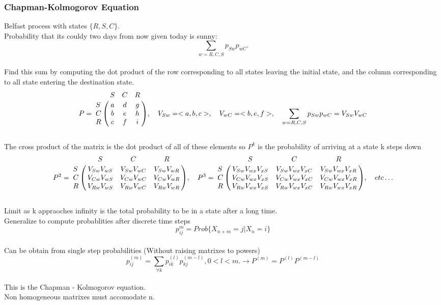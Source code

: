 \documentclass{article}
\begin{document}
	\subsubsection {Chapman-Kolmogorov Equation}
	Belfast process with states $\{R,S,C\}$. 
	\\Probability that its couldy two days from now given today is sunny: 
	\[ \sum\limits_{w=R,C,S}{p_{Sw}p_{wC}}. \]
	\\Find this sum by computing the dot product of the row corresponding to all states leaving the initial state, and the column corresponding to all state
	entering the destination state. 
	\[P = \bordermatrix{   
              & S    & C    & R    \cr
            S & a & d & g \cr
			C & b & e & h \cr
			R & c & f & i } 
			, \quad V_{Sw} = <a,b,c>
			, \quad V_{wC} = <b,e,f>
			, \quad \sum\limits_{w=R,C,S}{p_{Sw}p_{wC}} = V_{Sw}V_{wC}
    \]
	\\The cross product of the matrix is the dot product of all of these elements so $P^k$ is the probability of arriving at a state k steps down
	\[P^2= \bordermatrix{   
              & S    & C    & R    \cr
            S & V_{Sw}V_{wS} & V_{Sw}V_{wC} & V_{Sw}V_{wR} \cr
			C & V_{Cw}V_{wS} & V_{Cw}V_{wC} & V_{Cw}V_{wR} \cr
			R & V_{Rw}V_{wS} & V_{Rw}V_{wC} & V_{Rw}V_{wR} }  
	 ,\quad P^3= \bordermatrix{   
              & S    & C    & R    \cr
            S & V_{Sw}V_{wx}V_{xS} & V_{Sw}V_{wx}V_{xC} & V_{Sw}V_{wx}V_{xR} \cr
			C & V_{Cw}V_{wx}V_{xS} & V_{Cw}V_{wx}V_{xC} & V_{Cw}V_{wx}V_{xR} \cr
			R & V_{Rw}V_{wx}V_{xS} & V_{Rw}V_{wx}V_{xC} & V_{Rw}V_{wx}V_{xR} }  
	,\quad etc\ldots \]
	\\Limit as k appraoches infinity is the total probability to be in a state after a long time.  
	\\Generalize to compute probablities after discrete time steps 
	\[ p_{ij}^{m} = Prob\{ X_{n+m} = j | X_{n} = i \} \]
	\\Can be obtain from single step probabilities (Without raising matrixes to powers)
	\[ p_{ij}^{(m)} = \sum\limits_{\forall k}{p_{ik}^{(l)}p_{kj}^{(m-l)}}, 0 < l < m. \rightarrow P^{(m)} = P^{(l)}P^{(m-l)}\]
	\\This is the Chapman - Kolmogorov equation.
	\\Non homogeneous matrixes must accomodate n. 
\end{document}
